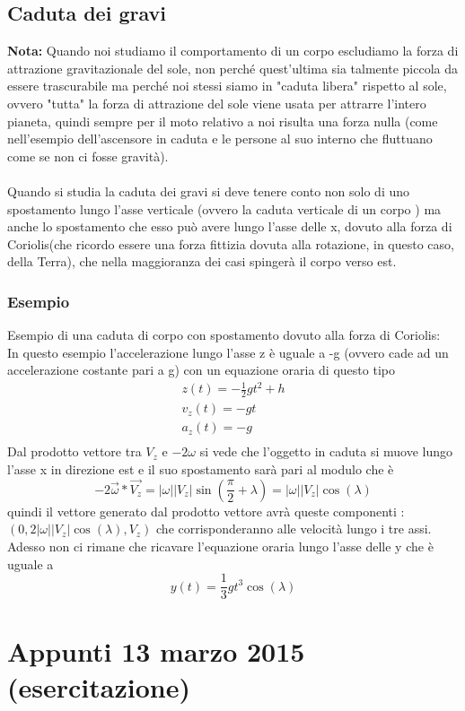 \documentclass[portait]{article}
\begin{document}
\subsection{Caduta dei gravi}
\textbf{Nota:} Quando noi studiamo il comportamento di un corpo escludiamo la forza di attrazione gravitazionale del sole, non perché quest'ultima sia talmente piccola da essere trascurabile ma perché noi stessi siamo in "caduta libera" rispetto al sole, ovvero "tutta" la forza di attrazione del sole viene usata per attrarre l'intero pianeta, quindi sempre per il moto relativo a noi risulta una forza nulla (come nell'esempio dell'ascensore in caduta e le persone al suo interno che fluttuano come se non ci fosse gravità). \\ \\
Quando si studia la caduta dei gravi si deve tenere conto non solo di uno spostamento lungo l'asse verticale (ovvero la caduta verticale di un corpo ) ma anche lo spostamento che esso può avere lungo l'asse delle x, dovuto alla forza di Coriolis(che ricordo essere una forza fittizia dovuta alla rotazione, in questo caso, della Terra), che nella maggioranza dei casi spingerà il corpo verso est.
\subsubsection{Esempio}
Esempio di una caduta di corpo con spostamento dovuto alla forza di Coriolis: \\ 
In questo esempio l'accelerazione lungo l'asse z è uguale a -g (ovvero cade ad un accelerazione costante pari a g) con un equazione oraria di questo tipo
\[ \begin{array}{lr}
z(t) = -\frac{1}{2}gt^2 + h \\
v_z(t) = -gt \\
a_z(t) = -g \\
\end{array}
\]
Dal prodotto vettore tra $V_z$ e $-2\omega$ si vede che l'oggetto in caduta si muove lungo l'asse x in direzione est e il suo spostamento sarà pari al modulo che è 
$$-2\overrightarrow{\omega}*\overrightarrow{V_z} = |\omega||V_z|\sin(\frac{\pi}{2} + \lambda) = |\omega||V_z|\cos(\lambda)$$
quindi il vettore generato dal prodotto vettore avrà queste componenti : $(0,2|\omega||V_z|\cos(\lambda),V_z)$ che corrisponderanno alle velocità lungo i tre assi.
Adesso non ci rimane che ricavare l'equazione oraria lungo l'asse delle y che è uguale a 
$$y(t) = \frac{1}{3}gt^3\cos(\lambda)$$
\section{Appunti 13 marzo 2015 (esercitazione)}
\end{document}
